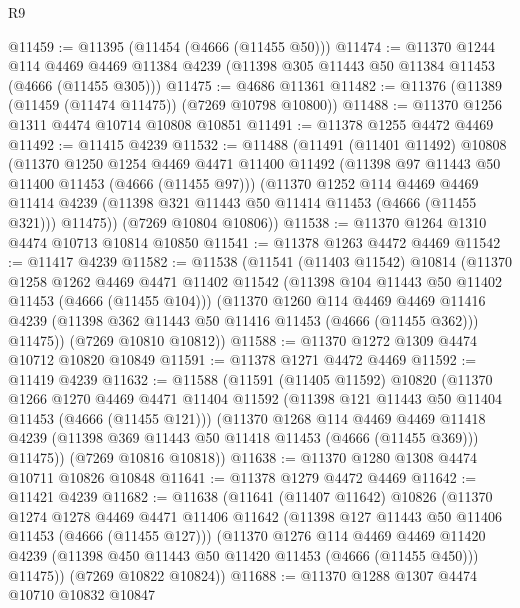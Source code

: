 \begin{lexlean}{R9}
\begin{coremodule}
@11459 := @11395 (@11454 (@4666 (@11455 @50)))
@11474 := @11370
    @1244
    @114
    @4469
    @4469
    @11384
    @4239
    (@11398 @305 @11443 @50 @11384 @11453 (@4666 (@11455 @305)))
@11475 := @4686 @11361
@11482 := @11376 (@11389 (@11459 (@11474 @11475)) (@7269 @10798 @10800))
@11488 := @11370 @1256 @1311 @4474 @10714 @10808 @10851
@11491 := @11378 @1255 @4472 @4469
@11492 := @11415 @4239
@11532 := @11488
    (@11491
      (@11401 @11492)
      @10808
      (@11370
        @1250
        @1254
        @4469
        @4471
        @11400
        @11492
        (@11398 @97 @11443 @50 @11400 @11453 (@4666 (@11455 @97)))
        (@11370
          @1252
          @114
          @4469
          @4469
          @11414
          @4239
          (@11398 @321 @11443 @50 @11414 @11453 (@4666 (@11455 @321)))
          @11475))
      (@7269 @10804 @10806))
@11538 := @11370 @1264 @1310 @4474 @10713 @10814 @10850
@11541 := @11378 @1263 @4472 @4469
@11542 := @11417 @4239
@11582 := @11538
    (@11541
      (@11403 @11542)
      @10814
      (@11370
        @1258
        @1262
        @4469
        @4471
        @11402
        @11542
        (@11398 @104 @11443 @50 @11402 @11453 (@4666 (@11455 @104)))
        (@11370
          @1260
          @114
          @4469
          @4469
          @11416
          @4239
          (@11398 @362 @11443 @50 @11416 @11453 (@4666 (@11455 @362)))
          @11475))
      (@7269 @10810 @10812))
@11588 := @11370 @1272 @1309 @4474 @10712 @10820 @10849
@11591 := @11378 @1271 @4472 @4469
@11592 := @11419 @4239
@11632 := @11588
    (@11591
      (@11405 @11592)
      @10820
      (@11370
        @1266
        @1270
        @4469
        @4471
        @11404
        @11592
        (@11398 @121 @11443 @50 @11404 @11453 (@4666 (@11455 @121)))
        (@11370
          @1268
          @114
          @4469
          @4469
          @11418
          @4239
          (@11398 @369 @11443 @50 @11418 @11453 (@4666 (@11455 @369)))
          @11475))
      (@7269 @10816 @10818))
@11638 := @11370 @1280 @1308 @4474 @10711 @10826 @10848
@11641 := @11378 @1279 @4472 @4469
@11642 := @11421 @4239
@11682 := @11638
    (@11641
      (@11407 @11642)
      @10826
      (@11370
        @1274
        @1278
        @4469
        @4471
        @11406
        @11642
        (@11398 @127 @11443 @50 @11406 @11453 (@4666 (@11455 @127)))
        (@11370
          @1276
          @114
          @4469
          @4469
          @11420
          @4239
          (@11398 @450 @11443 @50 @11420 @11453 (@4666 (@11455 @450)))
          @11475))
      (@7269 @10822 @10824))
@11688 := @11370 @1288 @1307 @4474 @10710 @10832 @10847

\end{coremodule}
\end{lexlean}
